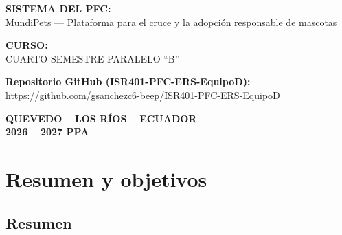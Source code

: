 \documentclass[journal,onecolumn]{IEEEtran}
\begin{document}
\begin{titlepage}
		\vspace{0.2cm}
		
		{\normalsize\bfseries SISTEMA DEL PFC:}\\[4pt]
		{\normalsize MundiPets --- Plataforma para el cruce y la adopción responsable de mascotas}
		
		\vspace{0.2cm}
		
		{\normalsize\bfseries CURSO:}\\[4pt]
		{\normalsize CUARTO SEMESTRE PARALELO \enquote{B}}
		
		\vspace{0.2cm}
		
		\textbf{Repositorio GitHub (ISR401-PFC-ERS-EquipoD):}\\
		\url{https://github.com/gsanchezc6-beep/ISR401-PFC-ERS-EquipoD}
		
		\vspace{1.0cm}
		
		{\normalsize\bfseries QUEVEDO -- LOS RÍOS -- ECUADOR}\\[4pt]
		{\normalsize\bfseries 2026 -- 2027 PPA}
		
	\end{titlepage}
	
	\newpage
	\tableofcontents
	\newpage
	\listoftables
	\newpage
	
	
	\section{Resumen y objetivos}
	\label{sec:resumen}
	
	\subsection{Resumen}
	
\end{document}
